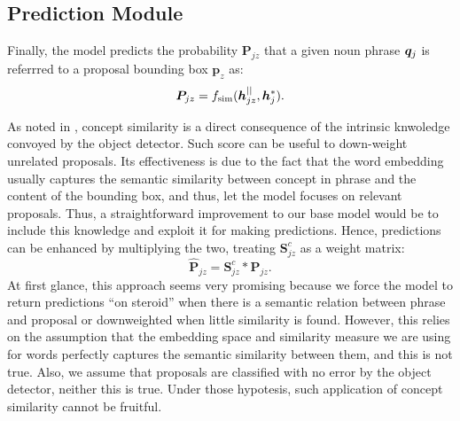 \subsection{Prediction Module}

Finally, the model predicts the probability $\bm{P}_{jz}$ that a given
noun phrase $\bm{q}_j$ is referrred to a proposal bounding box $\bm{p}_z$
as:
\begin{equation}
  \bm{P}_{jz} = f_{\text{sim}} ( \bm{h}^{||}_{jz} , \bm{h}^*_j ).
\end{equation}

As noted in \cite{chen2018knowledge}, concept similarity is a direct
consequence of the intrinsic knwoledge convoyed by the object
detector. Such score can be useful to down-weight unrelated proposals.
Its effectiveness is due to the fact that the word embedding usually
captures the semantic similarity between concept in phrase and the
content of the bounding box, and thus, let the model focuses on
relevant proposals. Thus, a straightforward improvement to our base
model would be to include this knowledge and exploit it for making
predictions. Hence, predictions can be enhanced by multiplying the
two, treating $\bm{S}^c_{jz}$ as a weight matrix:
\begin{equation}
  \bm{\hat{P}}_{jz} = \bm{S}^c_{jz} * \bm{P}_{jz}.
\end{equation}
At first glance, this approach seems very promising because we force
the model to return predictions ``on steroid'' when there is a
semantic relation between phrase and proposal or downweighted when
little similarity is found. However, this relies on the assumption
that the embedding space and similarity measure we are using for words
perfectly captures the semantic similarity between them, and this is
not true. Also, we assume that proposals are classified with no error
by the object detector, neither this is true. Under those hypotesis,
such application of concept similarity cannot be fruitful. 

